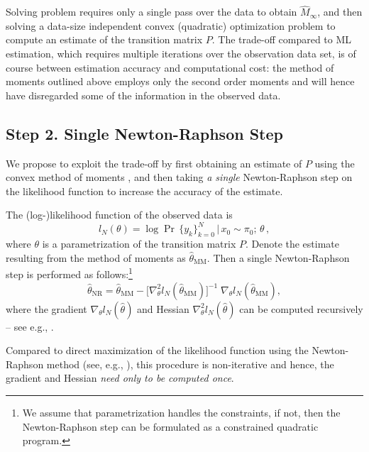 \documentclass[journal]{IEEEtran}
\newcommand{\thetaNR}{\hat \theta_\text{NR}}
\newcommand{\thetaMM}{\hat \theta_\text{MM}}
\newcommand{\hesslik}{\nabla_\theta^2 l_N}
\newcommand{\gradlik}{\nabla_\theta l_N}
\begin{document}
Solving problem  requires only a single pass over the data to obtain
$\hat M_\infty$, and then solving a data-size independent convex (quadratic) optimization
problem to compute an estimate of the transition matrix $P$. The trade-off compared to ML
estimation, which requires multiple iterations
over the observation data set, is of course between estimation accuracy and computational
cost: the method of moments outlined above employs only the second order moments and will
hence have disregarded some of the information in the observed data. 

\subsection*{Step 2. Single Newton-Raphson Step}

We propose to exploit the trade-off by first obtaining an estimate of $P$ using
the convex method of moments , and then taking \emph{a
single} Newton-Raphson step on the likelihood function to increase the accuracy
of the estimate.

The (log-)likelihood function of the observed data is
\begin{equation}
    l_{N}(\theta) = \log \Pr{ \, \{y_k\}_{k=0}^N \, | \, x_0 \sim \pi_0; \, \theta \,},
\end{equation}
where $\theta$ is a parametrization of the transition matrix $P$. Denote the estimate
resulting from the method of moments  as $\thetaMM$. Then a single
Newton-Raphson step is performed as follows:\footnote{We assume that parametrization handles the
constraints, if not, then the Newton-Raphson step can be formulated as a constrained
quadratic program.}
\begin{equation}
    \thetaNR = \thetaMM - \big[ \hesslik(\thetaMM)\big]^{-1} \; \gradlik(\thetaMM),
    \label{eq:newton_step}
\end{equation}
where the gradient $\nabla_\theta l_N(\hat \theta)$ and Hessian $\nabla_\theta^2 l_N(\hat
\theta)$ can be computed recursively -- see e.g., \cite{lystig_exact_2002,
cappe_recursive_2005, cappe_inference_2005, turner_direct_2008, khreich_survey_2012,
macdonald_numerical_2014}.

Compared to direct maximization of the likelihood function using the
Newton-Raphson method (see, e.g., \cite{cappe_inference_2005,
turner_direct_2008}), this procedure is non-iterative and hence, the gradient
and Hessian \emph{need only to be computed once}.
\end{document}
